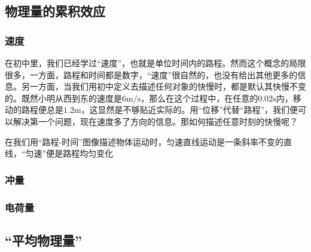
\subsection{物理量的累积效应}
\subsubsection{速度}
在初中里，我们已经学过“速度”，也就是单位时间内的路程。然而这个概念的局限很多，一方面，路程和时间都是数字，“速度”很自然的，也没有给出其他更多的信息。另一方面，当我们用初中定义去描述任何对象的快慢时，都是默认其快慢不变的。既然小明从西到东的速度是$6 \mathrm{m/s}$，那么在这个过程中，在任意的$0.02\mathrm s$内，移动的路程便总是$1.2\mathrm m$，这显然是不够贴近实际的。用“位移”代替“路程”，我们便可以解决第一个问题，现在速度多了方向的信息。那如何描述任意时刻的快慢呢？

在我们用“路程-时间”图像描述物体运动时，匀速直线运动是一条斜率不变的直线，“匀速”便是路程均匀变化
\subsubsection{冲量}
\subsubsection{电荷量}
\subsection{“平均物理量”}